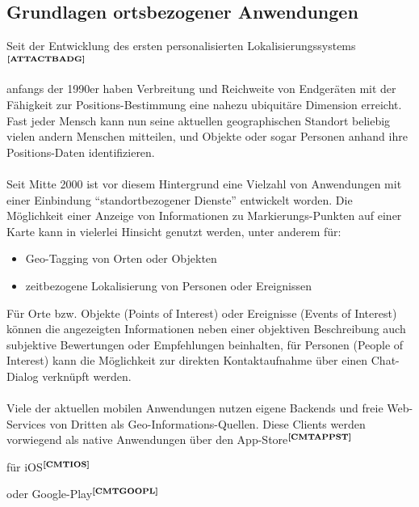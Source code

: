 \subsection{Grundlagen ortsbezogener Anwendungen}\label{3_GRUNDL}
Seit der Entwicklung des ersten personalisierten Lokalisierungssystems$^{\textbf{\ref{ATTACTBADG}}}$%
\addtocounter{footnote}{1}%
anfangs der 1990er haben Verbreitung und Reichweite von Endgeräten mit der Fähigkeit zur Positions-Bestimmung eine nahezu ubiquitäre Dimension erreicht. Fast jeder Mensch kann nun seine aktuellen geographischen Standort beliebig vielen andern Menschen mitteilen, und Objekte oder sogar Personen anhand ihre Positions-Daten identifizieren. \\ \\
Seit Mitte 2000 ist vor diesem Hintergrund eine Vielzahl von Anwendungen mit einer Einbindung "`standortbezogener Dienste"' entwickelt worden. Die Möglichkeit einer Anzeige von Informationen zu Markierungs-Punkten auf einer Karte kann in vielerlei Hinsicht genutzt werden, unter anderem für:
\begin{itemize}
  \item Geo-Tagging von Orten oder Objekten
  \item zeitbezogene Lokalisierung von Personen oder Ereignissen
\end{itemize}
\vspace{1ex}
Für Orte bzw. Objekte (Points of Interest) oder Ereignisse (Events of Interest) können die angezeigten Informationen neben einer objektiven Beschreibung auch subjektive Bewertungen oder Empfehlungen beinhalten, für Personen (People of Interest) kann die Möglichkeit zur direkten Kontaktaufnahme über einen Chat-Dialog verknüpft werden.\\ \\
Viele der aktuellen mobilen Anwendungen nutzen eigene Backends und freie Web-Services von Dritten als Geo-Informations-Quellen. Diese Clients werden vorwiegend als native Anwendungen über den App-Store$^{\textbf{\ref{CMTAPPST}}}$%
\addtocounter{footnote}{1}%
 für iOS$^{\textbf{\ref{CMTIOS}}}$%
\addtocounter{footnote}{1}%
 oder Google-Play$^{\textbf{\ref{CMTGOOPL}}}$%

